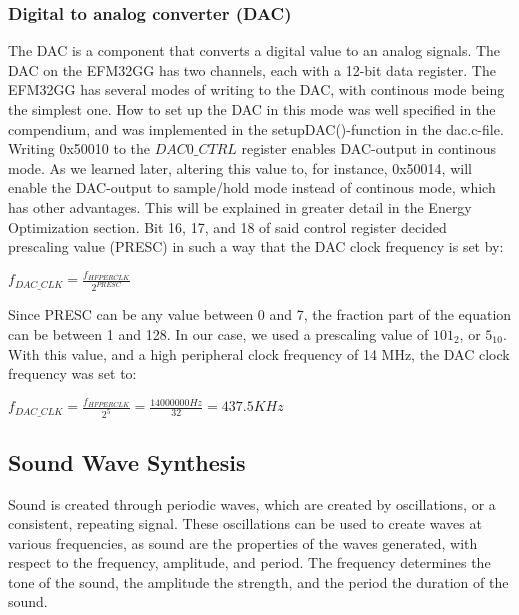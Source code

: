 \subsubsection{Digital to analog converter (DAC)}
The DAC is a component that converts a digital value to an analog signals. The DAC on the EFM32GG has two channels, each with a 12-bit data register. The EFM32GG has several modes of writing to the DAC, with continous mode being the simplest one. How to set up the DAC in this mode was well specified in the compendium, and was implemented in the setupDAC()-function in the dac.c-file. Writing 0x50010 to the $DAC0\_CTRL$ register enables DAC-output in continous mode. As we learned later, altering  this value to, for instance, 0x50014, will enable the DAC-output to sample/hold mode instead of continous mode, which has other advantages. This will be explained in greater detail in the Energy Optimization section. Bit 16, 17, and 18 of said control register decided prescaling value (PRESC) in such a way that the DAC clock frequency is set by:

\begin{center}

$f_{DAC\_CLK} = \frac{f_{HFPERCLK}}{2^{PRESC}}$

\end{center}

Since PRESC can be any value between 0 and 7, the fraction part of the equation can be between 1 and 128. In our case, we used a prescaling value of $101_2$, or $5_{10}$. With this value, and a high peripheral clock frequency of 14 MHz, the DAC clock frequency was set to:

\begin{center}

$f_{DAC\_CLK} = \frac{f_{HFPERCLK}}{2^{5}} = \frac{14000000 Hz}{32} = 437.5 KHz $

\end{center}

\subsection{Sound Wave Synthesis}

Sound is created through periodic waves, which are created by oscillations, or a consistent, repeating signal. These oscillations can be used to create waves at various frequencies, as sound are the properties of the waves generated, with respect to the frequency, amplitude, and period. The frequency determines the tone of the sound, the amplitude the strength, and the period the duration of the sound.

